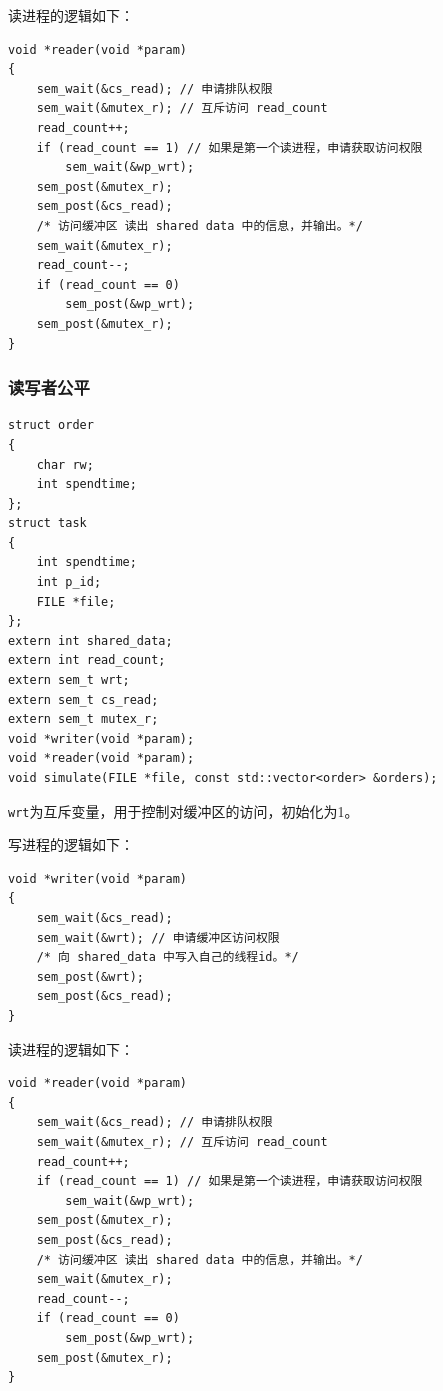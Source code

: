\documentclass[lang=cn,11pt,a4paper,cite=authornum]{paper}
\begin{document}
读进程的逻辑如下：

\begin{code}
\begin{verbatim}
void *reader(void *param)
{
    sem_wait(&cs_read); // 申请排队权限
    sem_wait(&mutex_r); // 互斥访问 read_count
    read_count++;
    if (read_count == 1) // 如果是第一个读进程，申请获取访问权限
        sem_wait(&wp_wrt);
    sem_post(&mutex_r);
    sem_post(&cs_read);
    /* 访问缓冲区 读出 shared data 中的信息，并输出。*/
    sem_wait(&mutex_r);
    read_count--;
    if (read_count == 0)
        sem_post(&wp_wrt);
    sem_post(&mutex_r);
}
\end{verbatim}
\end{code}

\subsubsection{读写者公平}

\begin{code}
\begin{verbatim}
struct order
{
    char rw;
    int spendtime;
};
struct task
{
    int spendtime;
    int p_id;
    FILE *file;
};
extern int shared_data;
extern int read_count;
extern sem_t wrt;
extern sem_t cs_read;
extern sem_t mutex_r;
void *writer(void *param);
void *reader(void *param);
void simulate(FILE *file, const std::vector<order> &orders);
\end{verbatim}
\end{code}

\texttt{wrt}为互斥变量，用于控制对缓冲区的访问，初始化为1。

写进程的逻辑如下：

\begin{code}
\begin{verbatim}
void *writer(void *param)
{
    sem_wait(&cs_read);
    sem_wait(&wrt); // 申请缓冲区访问权限
    /* 向 shared_data 中写入自己的线程id。*/
    sem_post(&wrt);
    sem_post(&cs_read);
}
\end{verbatim}
\end{code}

读进程的逻辑如下：

\begin{code}
\begin{verbatim}
void *reader(void *param)
{
    sem_wait(&cs_read); // 申请排队权限
    sem_wait(&mutex_r); // 互斥访问 read_count
    read_count++;
    if (read_count == 1) // 如果是第一个读进程，申请获取访问权限
        sem_wait(&wp_wrt);
    sem_post(&mutex_r);
    sem_post(&cs_read);
    /* 访问缓冲区 读出 shared data 中的信息，并输出。*/
    sem_wait(&mutex_r);
    read_count--;
    if (read_count == 0)
        sem_post(&wp_wrt);
    sem_post(&mutex_r);
}
\end{verbatim}
\end{code}
\end{document}
